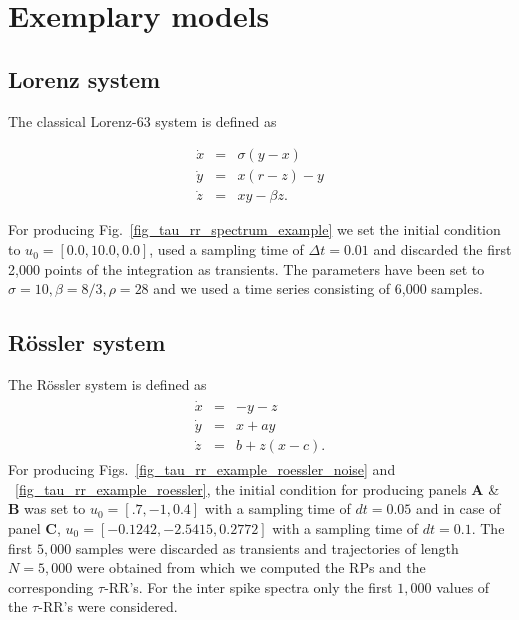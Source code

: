 \documentclass[entropy,article,submit,pdftex,moreauthors]{Definitions/mdpi}
\begin{document}
\appendixstart
\appendix

\section{Exemplary models}
 
\subsection{Lorenz system}\label{sec_models_lorenz63}

\noindent The classical Lorenz-63 system \cite{lorenz1963} is defined as

\begin{equation}
\begin{array}{rcl}
\dot{x}&=&\sigma(y-x) \\
\dot{y}&=&x(r-z)-y \\
\dot{z}&=&xy - \beta z.
\end{array}
\label{eq_model_Lorenz63}
\end{equation}

\noindent For producing Fig.~\ref{fig_tau_rr_spectrum_example} we set the initial condition to $u_0=[0.0, 10.0, 0.0]$, used a sampling time of $\Delta t=0.01$ and discarded the first 
2,000 points of the integration as transients. The parameters have been set to 
$\sigma=10, \beta=8/3, \rho=28$ and we used a time series consisting of 6,000 samples.

\subsection{R\"ossler system}\label{sec_models_roessler}

\noindent The R\"ossler system \cite{roessler1976} is defined as
\begin{align}
\begin{array}{rcl}
\dot{x}&=&-y-z \\
\dot{y}&=&x+ay \\
\dot{z}&=&b+ z(x-c) .
\end{array}
\label{eq_model_roessler}
\end{align}
For producing Figs.~\ref{fig_tau_rr_example_roessler_noise} and ~\ref{fig_tau_rr_example_roessler}, the initial condition for producing panels \textbf{A} \& \textbf{B} was set to $u_0=[.7, -1, 0.4]$ with a sampling time 
of $dt=0.05$ and in case of panel \textbf{C}, $u_0=[-0.1242, -2.5415, 0.2772]$ with a sampling time of $dt=0.1$. The first $5,000$ samples were discarded as transients and trajectories of length $N=5,000$ were 
obtained from which we computed the RPs and the corresponding $\tau$-RR's. For the inter spike spectra only the first $1,000$ values of the $\tau$-RR's were considered.
\end{document}
